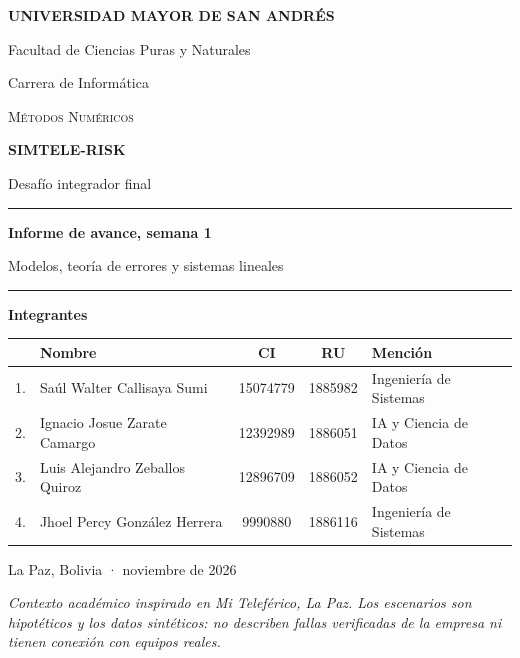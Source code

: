 \documentclass[
  11pt,
  letterpaper,
]{article}
\author{}
\date{}
\begin{document}
\begin{titlepage}
\centering
{\large\bfseries UNIVERSIDAD MAYOR DE SAN ANDRÉS\par}
\vspace{2pt}
{\normalsize Facultad de Ciencias Puras y Naturales\par}
{\normalsize Carrera de Informática\par}
\vspace{1.2cm}
{\normalsize\scshape Métodos Numéricos\par}
\vspace{1.4cm}
{\fontsize{34}{40}\selectfont\bfseries\color{azul} SIMTELE-RISK\par}
\vspace{4pt}
{\Large Desafío integrador final\par}
\vspace{1.0cm}
\rule{0.6\textwidth}{0.6pt}\par
\vspace{0.5cm}
{\large\bfseries Informe de avance, semana 1\par}
\vspace{2pt}
{\large Modelos, teoría de errores y sistemas lineales\par}
\vspace{0.5cm}
\rule{0.6\textwidth}{0.6pt}\par
\vspace{1.4cm}
{\large\bfseries Integrantes\par}
\vspace{6pt}
{\small
\renewcommand{\arraystretch}{1.35}
\begin{tabular}{@{}rlccl@{}}
\toprule
 & \textbf{Nombre} & \textbf{CI} & \textbf{RU} & \textbf{Mención}\\
\midrule
1. & Saúl Walter Callisaya Sumi & 15074779 & 1885982 & Ingeniería de Sistemas\\
2. & Ignacio Josue Zarate Camargo & 12392989 & 1886051 & IA y Ciencia de Datos\\
3. & Luis Alejandro Zeballos Quiroz & 12896709 & 1886052 & IA y Ciencia de Datos\\
4. & Jhoel Percy González Herrera & 9990880 & 1886116 & Ingeniería de Sistemas\\
\bottomrule
\end{tabular}\par}
\vfill
{\small La Paz, Bolivia · noviembre de 2026\par}
\vspace{6pt}
{\footnotesize\itshape Contexto académico inspirado en Mi Teleférico, La Paz. Los escenarios son hipotéticos y los datos sintéticos: no describen fallas verificadas de la empresa ni tienen conexión con equipos reales.\par}
\end{titlepage}
\setcounter{page}{1}
\end{document}
